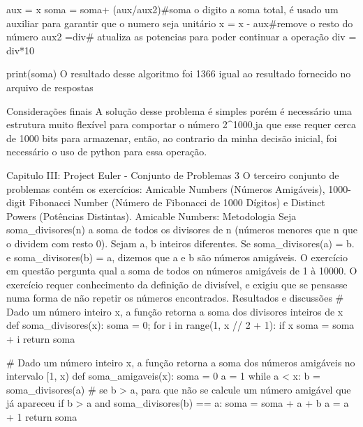                 aux = x%
                soma = soma+ (aux/aux2)#soma o digito a soma total, é usado um auxiliar para garantir que o numero seja unitário 
                x = x - aux#remove o resto do número
                aux2 =div# atualiza as potencias para poder continuar a operação
                div = div*10

            print(soma)
            O resultado desse algoritmo foi 1366 igual ao resultado fornecido no arquivo de respostas

        Considerações finais
            A solução desse problema é simples porém é necessário uma estrutura muito flexível para comportar o número 2^1000,ja que esse requer cerca de 1000 bits para armazenar, então, ao contrario da minha decisão inicial, foi necessário o uso de python para essa operação.

Capitulo III: Project Euler - Conjunto de Problemas 3
    O terceiro conjunto de problemas contém os exercícios: Amicable Numbers (Números Amigáveis), 1000-digit Fibonacci Number (Número de Fibonacci de 1000 Dígitos) e Distinct Powers (Potências Distintas).
    Amicable Numbers:
        Metodologia
            Seja soma_divisores(n) a soma de todos os divisores de n (números menores que n que o dividem com resto 0). Sejam a, b inteiros diferentes. Se soma_divisores(a) = b. e soma_divisores(b) = a, dizemos que a e b são números amigáveis. O exercício em questão pergunta qual a soma de todos on números amigáveis de 1 à 10000.
            O exercício requer conhecimento da definição de divisível, e exigiu que se pensasse numa forma de não repetir os números encontrados.
        Resultados e discussões
            # Dado um número inteiro x, a função retorna a soma dos divisores inteiros de x
            def soma_divisores(x):
                soma = 0;
                for i in range(1, x // 2 + 1):
                    if x %
                        soma = soma + i
                return soma

            # Dado um número inteiro x, a função retorna a soma dos números amigáveis no intervalo [1, x)
            def soma_amigaveis(x):
                soma = 0
                a = 1
                while a < x:
                    b = soma_divisores(a)
                    # se b > a, para que não se calcule um número amigável que já apareceu
                    if b > a and soma_divisores(b) == a:
                        soma = soma + a + b
                    a = a + 1
                return soma

